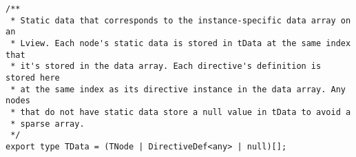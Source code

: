 \begin{verbatim}
/**
 * Static data that corresponds to the instance-specific data array on an
 * Lview. Each node's static data is stored in tData at the same index that
 * it's stored in the data array. Each directive's definition is stored here
 * at the same index as its directive instance in the data array. Any nodes
 * that do not have static data store a null value in tData to avoid a
 * sparse array.
 */
export type TData = (TNode | DirectiveDef<any> | null)[];
\end{verbatim}
